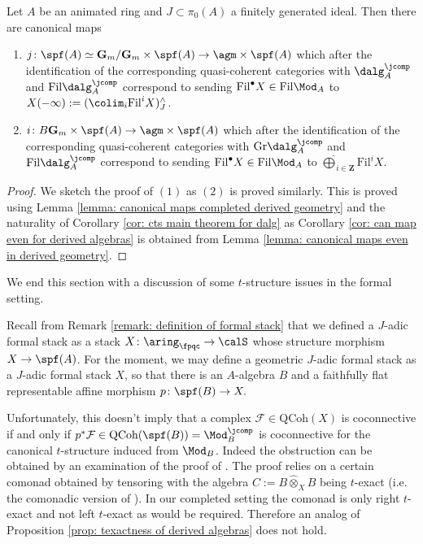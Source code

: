 \documentclass[10pt,reqno]{amsart}
\numberwithin{equation}{section}
\newcommand{\cF}{\mathcal{F}}
\newcommand{\G}{\mathbf{G}}
\newcommand{\ZZ}{\mathbf{Z}}
\newcommand{\Qcoh}{\mathrm{QCoh}}
\newcommand{\Gr}{\mathrm{Gr}}
\newcommand{\fil}{\mathrm{Fil}}
\begin{document}
\begin{corollary}\label{cor: can map in the completed derived setting.}
Let $A$ be an animated ring and $J\subset \pi_0(A)$ a finitely generated ideal. Then there are canonical maps
\begin{enumerate}
    \item $j\colon \spf(A)\simeq \G_m/\G_m\times \spf(A)\to \agm\times \spf(A) $ which after the identification of the corresponding quasi-coherent categories with $\dalg^\jcomp_A$ and $\fil\dalg^\jcomp_A$ correspond to sending $\fil^\bullet X\in \fil\Mod_A$ to $X(-\infty):=(\colim_i \fil^i X)^\wedge_J$.
     \item $i\colon B\G_m\times \spf(A)\to \agm\times \spf(A) $ which after the identification of the corresponding quasi-coherent categories with $\Gr\dalg^\jcomp_A$ and $\fil\dalg^\jcomp_A$ correspond to sending $\fil^\bullet X\in \fil\Mod_A$ to $\widehat{\bigoplus}_{i\in \ZZ} \fil^i X$.
\end{enumerate}
\end{corollary}   
\begin{proof}
We sketch the proof of $(1)$ as $(2)$ is proved similarly.
    This is proved using Lemma \ref{lemma: canonical maps completed derived geometry} and the naturality of Corollary \ref{cor: cts main theorem for dalg} as Corollary \ref{cor: can map even for derived algebras} is obtained from Lemma \ref{lemma: canonical maps even in derived geometry}.
\end{proof}

We end this section with a discussion of some $t$-structure issues in the formal setting. 

\begin{remark}
    Recall from Remark \ref{remark: definition of formal stack} that we defined a $J$-adic formal stack as a stack $X\colon \aring_\fpqc\to \calS$ whose structure morphism $X\to \spf(A)$. For the moment, we may define a geometric $J$-adic formal stack as a $J$-adic formal stack $X$, so that there is an $A$-algebra $B$ and a faithfully flat representable affine morphism $p\colon \spf(B)\to X.$

    Unfortunately, this doesn't imply that a complex $\cF\in \Qcoh(X)$ is coconnective if and only if $p^*\cF\in \Qcoh(\spf(B))=\Mod_B^{\jcomp}$ is coconnective for the canonical $t$-structure induced from $\Mod_B$. Indeed the obstruction can be obtained by an examination of the proof of \cite[Proposition 3.4.17]{Lurie2011DAGVIII}. The proof relies on a certain comonad obtained by tensoring with the algebra $C:=B\widehat{\otimes}_X B$ being $t$-exact (i.e. the comonadic version of \cite[Proposition 6.20]{Lur11b}). In our completed setting the comonad is only right $t$-exact and not left $t$-exact as would be required. Therefore an analog of Proposition \ref{prop: texactness of derived algebras} does not hold.

    
\end{remark}
\end{document}
